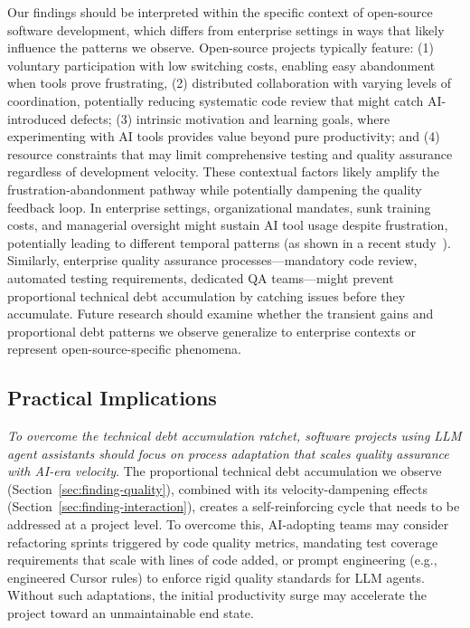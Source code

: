 Our findings should be interpreted within the specific context of open-source software development, which differs from enterprise settings in ways that likely influence the patterns we observe. 
Open-source projects typically feature: (1) voluntary participation with low switching costs, enabling easy abandonment when tools prove frustrating, (2) distributed collaboration with varying levels of coordination, potentially reducing systematic code review that might catch AI-introduced defects; (3) intrinsic motivation and learning goals, where experimenting with AI tools provides value beyond pure productivity; and (4) resource constraints that may limit comprehensive testing and quality assurance regardless of development velocity.
These contextual factors likely amplify the frustration-abandonment pathway while potentially dampening the quality feedback loop. 
In enterprise settings, organizational mandates, sunk training costs, and managerial oversight might sustain AI tool usage despite frustration, potentially leading to different temporal patterns (as shown in a recent study~\cite{kumar2025intuition}). 
Similarly, enterprise quality assurance processes---mandatory code review, automated testing requirements, dedicated QA teams---might prevent proportional technical debt accumulation by catching issues before they accumulate. 
Future research should examine whether the transient gains and 
proportional debt patterns we observe generalize to enterprise contexts or 
represent open-source-specific phenomena.

\subsection{Practical Implications}
\label{sec:practical-implications}

\emph{To overcome the technical debt accumulation ratchet, software projects using LLM agent assistants should focus on process adaptation that scales quality assurance with AI-era velocity}.
The proportional technical debt accumulation we observe (Section~\ref{sec:finding-quality}), combined with its velocity-dampening effects (Section~\ref{sec:finding-interaction}), creates a self-reinforcing cycle that needs to be addressed at a project level. 
To overcome this, AI-adopting teams may consider refactoring sprints triggered by code quality metrics, mandating test coverage requirements that scale with lines of code added, or prompt engineering (e.g., engineered Cursor rules) to enforce rigid quality standards for LLM agents. 
Without such adaptations, the initial productivity surge may accelerate the project toward an unmaintainable end state. 

